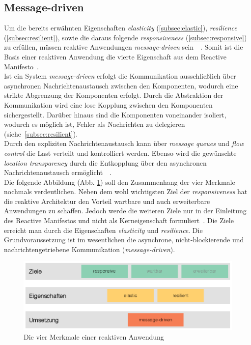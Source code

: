 \subsection{Message-driven}\label{subsec:messagedriven}
Um die bereits erwähnten Eigenschaften \textit{elasticity} (\ref{subsec:elastic}), \textit{resilience} (\ref{subsec:resilient}), sowie die daraus folgende \textit{responsiveness} (\ref{subsec:responsive}) zu erfüllen, müssen reaktive Anwendungen \textit{message-driven} sein~\cite{webber_what_2014}~\cite[S.~43]{kuhn_reactive_2015}. Somit ist die Basis einer reaktiven Anwendung die vierte Eigenschaft aus dem Reactive Manifesto~\cite{boner_reactive_2014}.\\
Ist ein System \textit{message-driven} erfolgt die Kommunikation ausschließlich über asynchronen Nachrichtenaustausch zwischen den Komponenten, wodurch eine strikte Abgrenzung der Komponenten erfolgt. Durch die Abstraktion der Kommunikation wird eine lose Kopplung zwischen den Komponenten sichergestellt. Darüber hinaus sind die Komponenten voneinander isoliert, wodurch es möglich ist, Fehler als Nachrichten zu delegieren (siehe~\ref{subsec:resilient}).\\
Durch den expliziten Nachrichtenaustausch kann über \textit{message queues} und \textit{flow control} die Last verteilt und kontrolliert werden. Ebenso wird die gewünschte \textit{location transparency} durch die Entkopplung über den asynchronen Nachrichtenaustausch ermöglicht~\cite{boner_reactive_2015}~\cite[S.~43]{kuhn_reactive_2015}.\\
Die folgende Abbildung (Abb. \ref{fig:four-traits}) soll den Zusammenhang der vier Merkmale nochmals verdeutlichen. Neben dem wohl wichtigsten Ziel der \textit{responsiveness} hat die reaktive Architektur den Vorteil wartbare und auch erweiterbare Anwendungen zu schaffen. Jedoch werde die weiteren Ziele nur in der Einleitung des Reactive Manifestos und nicht als Kerneigenschaft formuliert~\cite{boner_reactive_2014}. Die Ziele erreicht man durch die Eigenschaften \textit{elasticity} und \textit{resilience}. Die Grundvoraussetzung ist im wesentlichen die asynchrone, nicht-blockierende und nachrichtengetriebene Kommunikation (\textit{message-driven}).

\begin{figure}[H]
 \centering
 \includegraphics[width=1.0\textwidth]{3-Grundlagen/four-traits/four-traits.eps}
 \caption{Die vier Merkmale einer reaktiven Anwendung \cite{kuhn_code_2015}}
 \label{fig:four-traits}
\end{figure}

